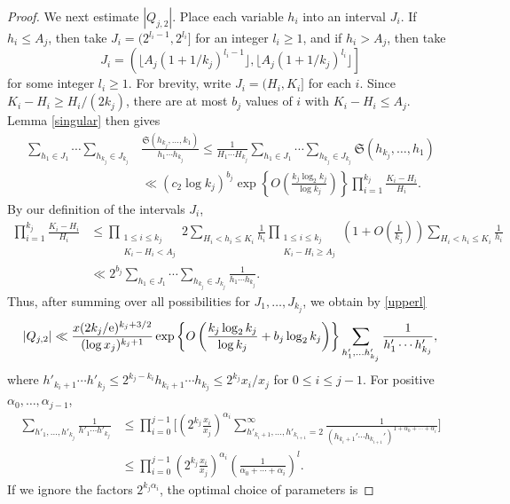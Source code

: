 \documentclass[12pt]{amsart}
\theoremstyle{remark}
\theoremstyle{plain}
\numberwithin{equation}{section}
\renewcommand{\SS}{\mathfrak{S}}  %
\renewcommand{\a}{\ensuremath{\alpha}}
\renewcommand{\(}{\left(}
\renewcommand{\)}{\right)}
\newcommand{\pfrac}[2]{\left(\frac{#1}{#2}\right)}
\newcommand{\er}{{\rm e}}  %
\renewcommand{\le}{\leqslant}
\renewcommand{\ge}{\geqslant}
\begin{document}
\begin{proof}
We next estimate $|Q_{j,2}|$.   Place each variable $h_i$ into an
interval $J_i$.  If $h_i \le A_j$, then take $J_i=(2^{l_i-1},2^{l_i}]$ for
an integer $l_i\ge 1$, and if $h_i > A_j$, then take
$$
J_i=\left (\lfloor A_j(1+1/k_j)^{l_i-1} \rfloor,
  \lfloor A_j(1+1/k_j)^{l_i}\rfloor \right]
$$
for some integer $l_i\ge 1$.  For brevity, write $J_i=(H_i,K_i]$ for each $i$.
Since $K_i-H_i \ge H_i/(2k_j)$, there are at most $b_j$ values of
$i$ with $K_i-H_i \le A_j$.  Lemma \ref{singular} then gives
\begin{align*}
\sum_{h_1\in J_1} \cdots \sum_{h_{k_j} \in J_{k_j}}
  &\frac{\SS(h_{k_j},\ldots,k_1)} {h_1 \cdots h_{k_j}} \le
\frac{1}{H_1 \cdots H_{k_j}}
  \sum_{h_1\in J_1} \cdots \sum_{h_{k_j} \in J_{k_j}} \SS(h_{k_j},\ldots,h_1) \\
&\ll (c_2\log k_j)^{b_j}\exp\left\{O\pfrac{k_j\log_2
    k_j}{\log k_j} \right\} \prod_{i=1}^{k_j} \frac{K_i-H_i}{H_i}.
\end{align*}
By our definition of the intervals $J_i$,
\begin{align*}
\prod_{i=1}^{k_j} \frac{K_i-H_i}{H_i} &\le \prod_{\substack{1\le i\le
  k_j \\ K_i-H_i < A_j}}
2\sum_{H_i<h_i\le K_i} \frac{1}{h_i} \prod_{\substack{1\le i\le k_j \\
K_i-H_i \ge A_j}}
\(1+O\pfrac{1}{k_j}\) \sum_{H_i<h_i\le K_i} \frac{1}{h_i} \\
&\ll 2^{b_j} \sum_{h_1\in J_1} \cdots \sum_{h_{k_j} \in J_{k_j}}
\frac{1}{h_1\cdots h_{k_j}}.
\end{align*}
Thus, after summing over all possibilities for $J_1,\ldots,J_{k_j}$,
we obtain by \eqref{upperl}
$$
|Q_{j,2}| \ll \frac{x (2k_j/\er)^{k_j+3/2}}{(\log x_j)^{k_j+1}}
\exp\left\{ O\( \frac{k_j\log_2 k_j}{\log k_j} + b_j \log_2 k_j \) \right\}
 \sum_{h'_1,\ldots h'_{k_j}} \frac{1}{h'_1 \cdots h'_{k_j}},
$$
where $h'_{k_i+1} \cdots h'_{k_{j}} \le 2^{k_{j}-k_i} h_{k_{i}+1}\cdots
h_{k_{j}}\le  2^{k_j} x_i/x_j$ for $0\le i\le j-1$.
For positive $\a_0, \ldots, \a_{j-1}$,
\begin{align*}
\sum_{h'_1,\ldots,h'_{k_j}} \frac{1}{h'_1 \cdots h'_{k_j}} &\le
  \prod_{i=0}^{j-1} \biggl[ \( 2^{k_{j}} \frac{x_i}{x_j} \)^{\a_i}
  \sum_{h'_{k_i+1}, \ldots,h'_{k_{i+1}}=2}^\infty
  \frac{1}{(h_{k_i+1}' \cdots h_{k_{i+1}}')^{1+\a_0+\cdots+\a_i}} \biggr] \\
&\le \prod_{i=0}^{j-1} \( 2^{k_{j}} \frac{x_i}{x_j} \)^{\a_i}
  \pfrac{1}{\a_0+\cdots+\a_i}^{l}.
\end{align*}
If we ignore the factors $2^{k_j\a_i}$, the optimal choice of parameters is

\end{proof}
\end{document}
